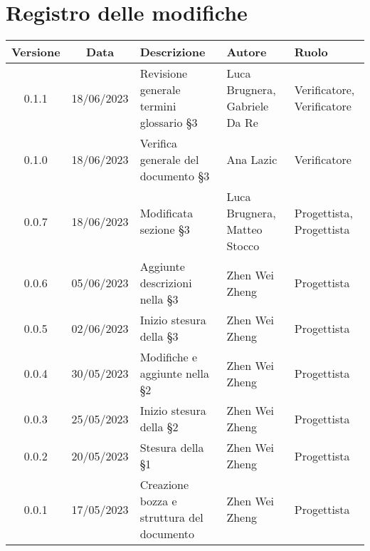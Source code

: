 \section*{Registro delle modifiche}
\begin{center}
\setlength\extrarowheight{5pt}
\renewcommand\tabularxcolumn[1]{>{\Centering}m{#1}}
\begin{tabularx}{\textwidth}{| c | c | X | X | X |} 
	\hline
	\rowcolor{white}
	\textbf{Versione} & \textbf{Data} & \textbf{Descrizione} & \textbf{Autore} & \textbf{Ruolo}\\
	\hline
	0.1.1 & 18/06/2023 & Revisione generale termini glossario §3 & Luca Brugnera, Gabriele Da Re & Verificatore, Verificatore\\
	\hline
	0.1.0 & 18/06/2023 & Verifica generale del documento §3 & Ana Lazic & Verificatore\\
	\hline
	0.0.7 & 18/06/2023 & Modificata sezione §3 & Luca Brugnera, Matteo Stocco & Progettista, Progettista\\
	\hline
	0.0.6 & 05/06/2023 & Aggiunte descrizioni nella §3 & Zhen Wei Zheng & Progettista\\
	\hline
	0.0.5 & 02/06/2023 & Inizio stesura della §3 & Zhen Wei Zheng & Progettista\\
	\hline
	0.0.4 & 30/05/2023 & Modifiche e aggiunte nella §2 & Zhen Wei Zheng & Progettista\\
	\hline
	0.0.3 & 25/05/2023 & Inizio stesura della §2 & Zhen Wei Zheng & Progettista\\
	\hline
	0.0.2 & 20/05/2023 & Stesura della §1 & Zhen Wei Zheng & Progettista\\
	\hline
	0.0.1 & 17/05/2023 & Creazione bozza e struttura del documento & Zhen Wei Zheng & Progettista\\
	\hline
	\end{tabularx}
\end{center}
